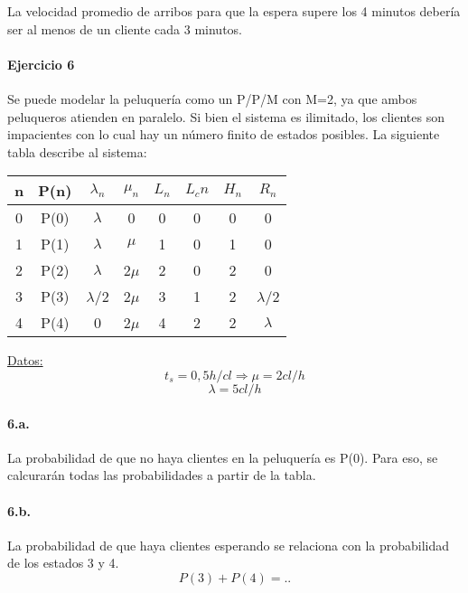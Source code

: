 \documentclass{article}
\begin{document}
    La velocidad promedio de arribos para que la espera supere los 4 minutos debería ser al menos de un cliente cada 3 minutos.
    
    
    
\paragraph{Ejercicio 6}
    Se puede modelar la peluquería como un P/P/M con M=2, ya que ambos peluqueros atienden en paralelo. Si bien el sistema es ilimitado, los clientes son impacientes con lo cual hay un número finito de estados posibles.
    La siguiente tabla describe al sistema:
    \begin{center}
    \begin{tabular}{|| c | c | c | c | c | c | c | c ||}
    \hline 
     n & P(n) & $\lambda_n$ & $\mu_n$ & $L_n$& $L_cn$ & $H_n$ & $R_n$ \\ \hline \hline
     0 & P(0) & $\lambda$   & 0       & 0    & 0      & 0     & 0	\\ \hline
     1 & P(1) & $\lambda$   & $\mu$   & 1    & 0      & 1     & 0	\\ \hline
     2 & P(2) & $\lambda$   & 2$\mu$  & 2    & 0      & 2     & 0	\\ \hline
     3 & P(3) & $\lambda$/2 & 2$\mu$  & 3    & 1      & 2     & $\lambda$/2 \\ \hline
     4 & P(4) & 0           & 2$\mu$  & 4    & 2      & 2     & $\lambda$   \\ \hline  
     
    \end{tabular}
    \end{center}
    \underline{Datos:} \\
    $$t_s = 0,5 h/cl  \Rightarrow \mu = 2 cl/h $$
    $$\lambda = 5 cl/h $$
    
    \paragraph{6.a.} La probabilidad de que no haya clientes en la peluquería es P(0). Para eso, se calcurarán todas las probabilidades a partir de la tabla.
    
    \paragraph{6.b.} La probabilidad de que haya clientes esperando se relaciona con la probabilidad de los estados 3 y 4. \\
    $$P(3) + P(4) = ..$$
    
\end{document}
